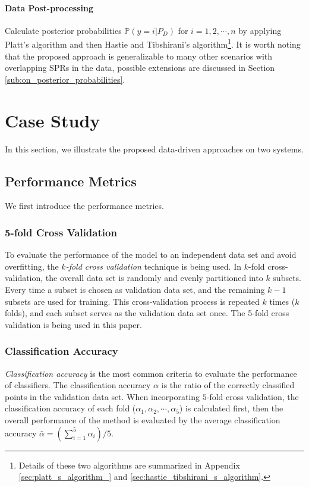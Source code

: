 \documentclass[letterpaper, 11pt]{article}
\theoremstyle{plain}
\theoremstyle{definition}
\begin{document}
\paragraph{Data Post-processing} \label{par:step_2}
Calculate posterior probabilities $\mathbb{P}(y = i | P_D)$ for $i=1,2,\cdots, n$ by applying Platt's algorithm and then Hastie and Tibshirani's algorithm\footnote{Details of these two algorithms are summarized in Appendix \ref{sec:platt_s_algorithm_} and \ref{sec:hastie_tibshirani_s_algorithm}.}.
It is worth noting that the proposed approach is generalizable to many other scenarios with overlapping SPRs in the data, possible extensions are discussed in Section \ref{sub:on_posterior_probabilities}.









\section{Case Study} \label{sec:case_study}
In this section, we illustrate the proposed data-driven approaches on two systems.
\subsection{Performance Metrics} \label{sub:performance_measurements}
We first introduce the performance metrics.
\subsubsection{5-fold Cross Validation} \label{ssub:cross_validation}
To evaluate the performance of the model to an independent data set and avoid overfitting, the \emph{$k$-fold cross validation} technique is being used.
In $k$-fold cross-validation, the overall data set is randomly and evenly partitioned into $k$ subsets. Every time a subset is chosen as validation data set, and the remaining $k-1$ subsets are used for training. This cross-validation process is repeated $k$ times ($k$ folds), and each subset serves as the validation data set once.
The 5-fold cross validation is being used in this paper.



\subsubsection{Classification Accuracy} \label{ssub:classification_accuracy_eval}
\emph{Classification accuracy} is the most common criteria to evaluate the performance of classifiers. The classification accuracy $\alpha$ is the ratio of the correctly classified points in the validation data set.
When incorporating $5$-fold cross validation, the classification accuracy of each fold ($\alpha_1, \alpha_2, \cdots, \alpha_5$) is calculated first, then the overall performance of the method is evaluated by the average classification accuracy 
$\bar{\alpha} = (\sum_{i=1}^5 \alpha_i)/5$.
\end{document}
